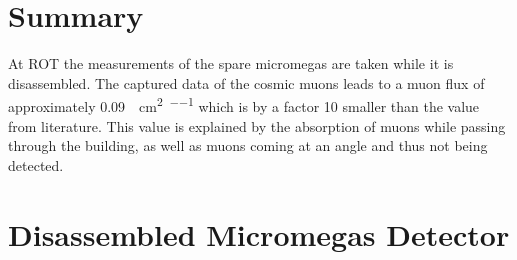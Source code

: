 \documentclass[sn-mathphys-num,iicol]{sn-jnl}
\theoremstyle{thmstyleone}
\theoremstyle{thmstyletwo}
\theoremstyle{thmstylethree}
\begin{document}








\section{Summary}
At ROT the measurements of the spare micromegas are taken while it is disassembled.
The captured data of the cosmic muons leads to a muon flux of approximately \SI{.09}{\per\centi\meter\squared\per\min} which is by a factor 10 smaller than the value from literature.
This value is explained by the absorption of muons while passing through the building, as well as muons coming at an angle and thus not being detected.


\clearpage\appendix\onecolumn


\section{Disassembled Micromegas Detector}
\renewcommand{\thefigure}{\Alph{section}\arabic{figure}}
\setcounter{figure}{0}
\renewcommand{\thetable}{\Alph{section}\arabic{table}}
\setcounter{table}{0}
\end{document}
